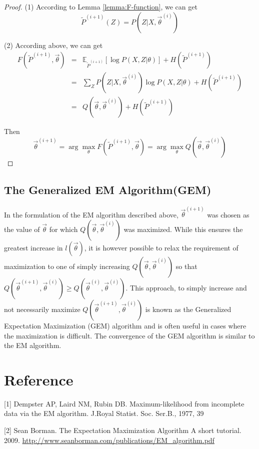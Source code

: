 \begin{proof}
(1) According to Lemma \ref{lemma:F-function}, we can get
\begin{equation}
\tilde{P}^{(i+1)}(Z)=P(Z|X, \vec{\theta}^{(i)}) \nonumber
\end{equation}

(2) According above, we can get
\begin{eqnarray}
F(\tilde{P}^{(i+1)},\vec{\theta}) &=& \mathbb{E}_{\tilde{P}^{(i+1)}}\left[\log{P(X,Z|\theta)}\right]+H(\tilde{P}^{(i+1)}) \nonumber \\
    &=& \sum\limits_Z{P(Z|X,\vec{\theta}^{(i)})\log{P(X,Z|\theta)}}+H(\tilde{P}^{(i+1)}) \nonumber \\
	&=& Q(\vec{\theta}, \vec{\theta}^{(i)})+H(\tilde{P}^{(i+1)})\nonumber
\end{eqnarray}

Then
\begin{equation}
\vec{\theta}^{(i+1)}=\arg\max\limits_{\theta}F(\tilde{P}^{(i+1)},\vec{\theta})=\arg\max\limits_{\theta}Q(\vec{\theta}, \vec{\theta}^{(i)}) \nonumber
\end{equation}
\end{proof}


\subsection{The Generalized EM Algorithm(GEM)}
In the formulation of the EM algorithm described above, $\vec{\theta}^{(i+1)}$ was chosen as the value of $\vec{\theta}$ for which $Q(\vec{\theta}, \vec{\theta}^{(i)})$ was maximized. While this ensures the greatest increase in $l(\vec{\theta})$, it is however possible to relax the requirement of maximization to one of simply increasing $Q(\vec{\theta}, \vec{\theta}^{(i)})$ so that $Q(\vec{\theta}^{(i+1)}, \vec{\theta}^{(i)}) \geq Q(\vec{\theta}^{(i)}, \vec{\theta}^{(i)})$. This approach, to simply increase and not necessarily maximize $Q(\vec{\theta}^{(i+1)}, \vec{\theta}^{(i)})$ is known as the Generalized Expectation Maximization (GEM) algorithm and is often useful in cases where the maximization is difficult. The convergence of the GEM algorithm is similar to the EM algorithm.


\section{Reference}
[1] Dempster AP, Laird NM, Rubin DB. Maximum-likelihood from incomplete data via the EM algorithm. J.Royal Statist. Soc. Ser.B., 1977, 39

[2] Sean Borman. The Expectation Maximization Algorithm A short tutorial. 2009. \url{http://www.seanborman.com/publications/EM_algorithm.pdf}